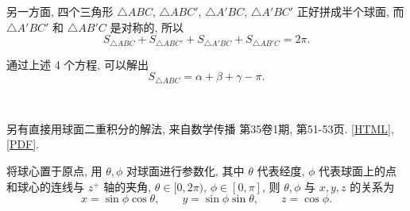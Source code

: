 另一方面, 四个三角形 $\triangle ABC$, $\triangle ABC'$, $\triangle A'BC$, $\triangle A'BC'$ 正好拼成半个球面, 而 $\triangle A'BC'$ 和 $\triangle AB'C$ 是对称的, 所以
\[S_{\triangle ABC} + S_{\triangle ABC'} + S_{\triangle A'BC} + S_{\triangle AB'C} = 2\pi .\]

通过上述 4 个方程, 可以解出
\[S_{\triangle ABC} = \alpha + \beta + \gamma - \pi .\]

~

另有直接用球面二重积分的解法, 来自数学传播 第35卷1期, 第51-53页. \href{https://web.math.sinica.edu.tw/mathmedia/HTMLarticle18.jsp?mID=35105}{[HTML]}, \href{https://web.math.sinica.edu.tw/math_media/d351/35105.pdf}{[PDF]}.

将球心置于原点, 用 $\theta,\phi$ 对球面进行参数化, 其中 $\theta$ 代表经度, $\phi$ 代表球面上的点和球心的连线与 $z^+$ 轴的夹角, $\theta\in[0,2\pi)$, $\phi\in[0,\pi]$, 则 $\theta, \phi$ 与 $x,y,z$ 的关系为
\[x = \sin\phi \cos\theta, \qquad y = \sin\phi \sin\theta, \qquad z = \cos\phi .\]

